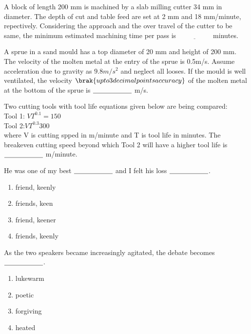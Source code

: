 \iffalse
\chapter{2017}
\author{AI24BTECH11013}
\section{me}
\fi
\item A block of length 200 mm is machined by a slab milling cutter 34 mm in diameter. The depth of cut and table feed are set at 2 mm and 18 mm/minute, repectively. Considering the approach and the over travel of the cutter to be same, the minimum estimated machining time per pass is $\underline{\hspace{2cm}}$ minutes.
\item A sprue in a sand mould has a top diameter of 20 mm and height of 200 mm. The velocity of the molten metal at the entry of the sprue is 0.5m/s. Assume acceleration due to gravity as $9.8 m/{s}^2$ and neglect all looses. If the mould is well ventilated, the velocity $\brak{upto 3 decimal points accuracy}$ of the molten metal at the bottom of the sprue is $\underline{\hspace{2 cm}}$ m/s.
\item Two cutting tools with tool life equations given below are being compared:\\
Tool 1: $VT^{0.1} = 150$\\
Tool 2:$VT^{0.3} 300$\\
where V is cutting spped in m/minute and T is tool life in minutes. The breakeven cutting speed beyond which Tool 2 will have a higher tool life is $\underline{\hspace{2 cm}}$ m/minute.
\item He was one of my best $\underline{\hspace{2 cm}}$ and I felt his loss $\underline{\hspace{2 cm}}$.
\begin{enumerate}
    \item friend, keenly
    \item friends, keen 
    \item friend, keener 
    \item friends, keenly
\end{enumerate}
\item As the two speakers became increasingly agitated, the debate becomes $\underline{\hspace{2 cm}}$.
\begin{enumerate}
    \item lukewarm
    \item poetic 
    \item forgiving
    \item heated
\end{enumerate}
